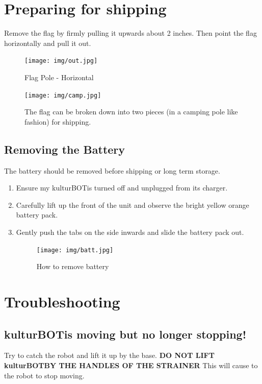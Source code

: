 \documentclass[]{article}
\newcommand{\kb}{kulturBOT}
\newcommand{\kbspace}{\kb \space}
\newcommand{\mykb}{my \kb}
\newcommand{\mykbspace}{\mykb \space}
\begin{document}
\section{Preparing for shipping}

Remove the flag by firmly pulling it upwards about 2 inches. Then point the flag horizontally and pull it out.\\ 

	\begin{figure}[h!]
		\centering
	    \texttt{[image: img/out.jpg]}
	    \caption{Flag Pole - Horizontal}
	\end{figure}
	
	\clearpage
	\vfill
	
	
		\begin{figure}[h!]
			\centering
		    \texttt{[image: img/camp.jpg]}
		    \caption{The flag can be broken down into two pieces (in a camping pole like fashion) for shipping.}
		\end{figure}
		\clearpage
	\subsection{Removing the Battery}
	
	The battery should be removed before shipping or long term storage.
	
	\begin{enumerate}
	\item Ensure \mykbspace is turned off and unplugged from its charger.
	\item Carefully lift up the front of the unit and observe the bright yellow orange battery pack.
	\item Gently push the tabs on the side inwards and slide the battery pack out.
	
		\begin{figure}[h!]
			\centering
		    \texttt{[image: img/batt.jpg]}
		    \caption{How to remove battery}
		\end{figure}
	\end{enumerate}
\clearpage
\section{Troubleshooting}
\subsection{\kbspace is moving but no longer stopping!}
Try to catch the robot and lift it up by the base. \textbf{DO NOT LIFT \kbspace BY THE HANDLES OF THE STRAINER} This will cause to the robot to stop moving.
\end{document}
